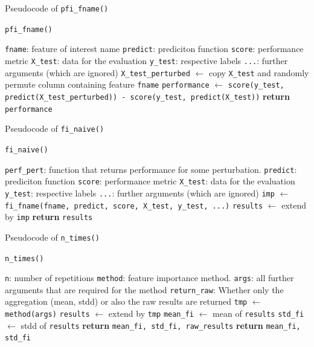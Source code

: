 {\begin{enumerate}[a)]
		Pseudocode of \texttt{pfi\_fname()}
		
		\begin{algorithm}[H]
			\caption{\texttt{pfi\_fname()}}
			\begin{algorithmic}[1]
				\Require \texttt{fname}: feature of interest name
				\Require \texttt{predict}: prediciton function
				\Require \texttt{score}: performance metric
				\Require \texttt{X\_test}: data for the evaluation
				\Require \texttt{y\_test}: respective labels
				\Require \texttt{...}: further arguments (which are ignored)
				\State \texttt{X\_test\_perturbed} $\gets$ copy \texttt{X\_test} and randomly permute column containing feature \texttt{fname}
				\State \texttt{performance} $\gets$ \texttt{score(y\_test, predict(X\_test\_perturbed)) - score(y\_test, predict(X\_test))}
				\State \textbf{return} \texttt{performance}
			\end{algorithmic}
		\end{algorithm}
		
		Pseudocode of \texttt{fi\_naive()}
		
		\begin{algorithm}[H]
			\caption{\texttt{fi\_naive()}}
			\begin{algorithmic}[1]
				\Require \texttt{perf\_pert}: function that returns performance for some perturbation.
				\Require \texttt{predict}: prediciton function
				\Require \texttt{score}: performance metric
				\Require \texttt{X\_test}: data for the evaluation
				\Require \texttt{y\_test}: respective labels
				\Require \texttt{...}: further arguments (which are ignored)
				\State \texttt{imp} $\gets$ \texttt{fi\_fname(fname, predict, score, X\_test, y\_test, ...)}
				\State \texttt{results} $\gets$ extend by \texttt{imp}
				\EndFor
				\State \textbf{return} \texttt{results}
			\end{algorithmic}
		\end{algorithm}
		
		Pseudocode of \texttt{n\_times()}
		
		\begin{algorithm}[H]
			\caption{\texttt{n\_times()}}
			\begin{algorithmic}[1]
				\Require \texttt{n}: number of repetitions
				\Require \texttt{method}: feature importance method.
				\Require \texttt{args}: all further arguments that are required for the method
				\Require \texttt{return\_raw}: Whether only the aggregation (mean, stdd) or also the raw results are returned
				\State \texttt{tmp} $\gets$ \texttt{method(args)}
				\State \texttt{results} $\gets$ extend by \texttt{tmp}
				\EndFor
				\State \texttt{mean\_fi} $\gets$ mean of \texttt{results}
				\State \texttt{std\_fi} $\gets$ stdd of \texttt{results}
				 \textbf{return} \texttt{mean\_fi, std\_fi, raw\_results}
				 \textbf{return} \texttt{mean\_fi, std\_fi}
				\EndIf
			\end{algorithmic}
		\end{algorithm}
		

\end{enumerate}}
